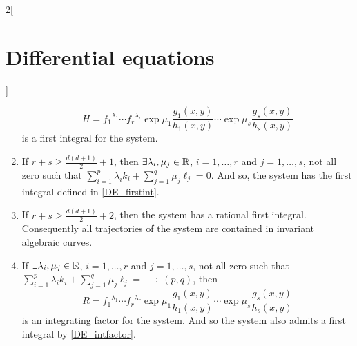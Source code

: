\documentclass[../../../main.tex]{subfiles}
\begin{document}
\begin{multicols}{2}[\section{Differential equations}]
\begin{theorem}
\begin{enumerate}
            \begin{equation}\label{DE_firstint}
              H={f_1}^{\lambda_1}\cdots{f_r}^{\lambda_r}\exp{\mu_1\frac{g_1(x,y)}{h_1(x,y)}}\cdots\exp{\mu_s\frac{g_s(x,y)}{h_s(x,y)}}
            \end{equation}
            is a first integral for the system.
      \item If $r+s\geq \frac{d(d+1)}{2}+1$, then $\exists \lambda_i,\mu_j\in\mathbb{R}$, $i=1,\ldots,r$ and $j=1,\ldots,s$, not all zero such that $\sum_{i=1}^p\lambda_ik_i+\sum_{j=1}^q\mu_j\ell_j=0$. And so, the system has the first integral defined in \cref{DE_firstint}.
      \item If $r+s\geq \frac{d(d+1)}{2}+2$, then the system has a rational first integral. Consequently all trajectories of the system are contained in
            invariant algebraic curves.
      \item If $\exists \lambda_i,\mu_j\in\mathbb{R}$, $i=1,\ldots,r$ and $j=1,\ldots,s$, not all zero such that $\sum_{i=1}^p\lambda_ik_i+\sum_{j=1}^q\mu_j\ell_j=-\div(p,q)$, then
            \begin{equation*}
              R={f_1}^{\lambda_1}\cdots{f_r}^{\lambda_r}\exp{\mu_1\frac{g_1(x,y)}{h_1(x,y)}}\cdots\exp{\mu_s\frac{g_s(x,y)}{h_s(x,y)}}
            \end{equation*}
            is an integrating factor for the system. And so the system also admits a first integral by \cref{DE_intfactor}.
    \end{enumerate}
  \end{theorem}

\end{multicols}
\end{document}
